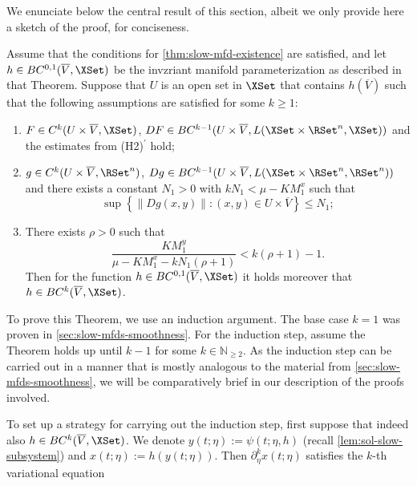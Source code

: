 \documentclass[a4paper]{siamart190516}
\begin{document}
We enunciate below the central result of this section, albeit we only provide here a
sketch of the proof, for conciseness.
 
 \begin{theorem}\label{thm:slow-mfd-k-smoothness}
Assume that the conditions for \cref{thm:slow-mfd-existence} are satisfied, and let $h \in BC^{0,1}(\overline{V},\XSet)$ be the invzriant manifold parameterization 
as described in that Theorem. Suppose that $U$ is an open set in $\XSet$ that contains $h(\overline{V})$ such that the following assumptions are satisfied for some $k \geq 1$:
 \begin{enumerate}
 \item $F \in C^k(U \times \overline{V}, \XSet)$, $D F \in BC^{k-1} (U \times \overline{V}, L(\XSet \times \RSet^n, \XSet))$ and the estimates from (H2)$^{\prime}$ hold;
 \item $g \in C^k(U \times \overline{V}, \RSet^n)$, $D g \in BC^{k-1} (U \times \overline{V}, L(\XSet \times \RSet^n, \RSet^n))$  and there exists a constant $N_1 > 0$ with $k N_1 < \mu - K M^x_1$ such that
 \[
 \sup\left\{\| D g(x,y) \|: (x,y) \in U \times \overline{V}\right \}  \leq N_1;
 \]
 \item There exists $\rho > 0$ such that 
\[
\frac{K M^y_1}{\mu-K M^x_1-k N_1 (\rho+1)} < k(\rho+1)-1.
\]
Then for the function $h \in BC^{0,1}(\overline{V},\XSet)$ it holds moreover that $h \in BC^{k}(\overline{V},\XSet)$.
 \end{enumerate}
 \end{theorem}
 
To prove this Theorem, we use an induction argument. The base case $k =1$ was proven
in \cref{sec:slow-mfds-smoothness}. For the induction step, assume the Theorem holds
up until $k-1$ for some $k \in \mathbb{N}_{\geq 2}$. As the induction step can be
carried out in a manner that is mostly analogous to the material from
\cref{sec:slow-mfds-smoothness}, we will be comparatively brief in our description of
the proofs involved.

 To set up a strategy for carrying out the induction step, first suppose that indeed
 also $h \in BC^{k}(\overline{V},\XSet)$. We denote $y(t; \eta) := \psi(t; \eta, h)$
 (recall \cref{lem:sol-slow-subsystem}) and $x(t; \eta) := h(y(t;\eta))$. Then $\partial^k_\eta x(t; \eta)$ satisfies the $k$-th variational equation
\end{document}
